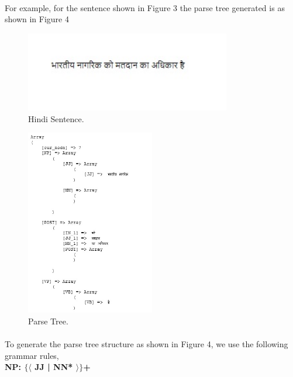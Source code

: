\break
\paragraph{}
For example, for the sentence shown in Figure 3 the parse tree generated is as shown in Figure 4

\begin{figure}[htb]
\centering
\includegraphics[width=0.8\textwidth]{images/sentence.jpg}
\caption{Hindi Sentence.} 
\label{fig:sentence}
\end{figure}

\begin{figure}[htb]
\centering
\includegraphics[width=0.5\textwidth]{images/parsetree.jpg}
\caption{Parse Tree.} 
\label{fig:parsetree}
\end{figure}

\break
\paragraph{}
To generate the parse tree structure as shown in Figure 4, we use the following grammar rules, \\

\textbf {NP: $\{ \langle$ JJ | NN* $\rangle \}$+}  \\

